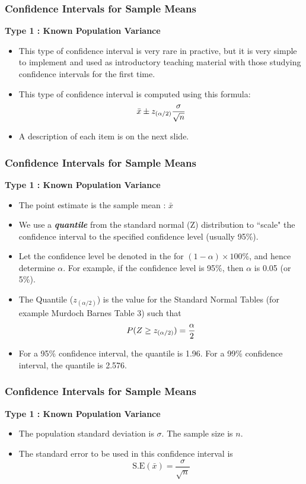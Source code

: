 \documentclass[a4]{beamer}
\begin{document}
\begin{frame}
\frametitle{Confidence Intervals for Sample Means}
\textbf{Type 1 : Known Population Variance}\\
\begin{itemize}
\item This type of confidence interval is very rare in practive, but it is very simple to implement and used as introductory
teaching material with those studying confidence intervals for the first time.
\item This type of confidence interval is computed using this formula:
\[ \bar{x} \pm z_{(\alpha/2)}{\sigma \over \sqrt{n}} \]
\item A description of each item is on the next slide.
\end{itemize}
\end{frame}


\begin{frame}
\frametitle{Confidence Intervals for Sample Means}
\textbf{Type 1 : Known Population Variance}\\
\begin{itemize}

\item The point estimate is the sample mean : $\bar{x}$

\item We use a \textbf{\textit{quantile}} from the standard normal (Z) distribution to ``scale"
the confidence interval to the specified confidence level (usually 95\%).

\item Let the confidence level be denoted in the for $(1-\alpha)\times 100\%$, and hence determine $\alpha$.
For example, if the confidence level is 95\%, then $\alpha$ is 0.05 (or 5\%).

\item The Quantile ($z_{(\alpha/2)}$) is the value for the Standard Normal Tables (for example Murdoch Barnes Table 3) such that
\[ P(Z \geq z_{(\alpha/2)}) = {\alpha \over 2}\]

\item For a 95\% confidence interval, the quantile is 1.96. For a 99\% confidence interval, the quantile is 2.576.
\end{itemize}
\end{frame}
\begin{frame}
\frametitle{Confidence Intervals for Sample Means}
\textbf{Type 1 : Known Population Variance}\\
\begin{itemize}

\item The population standard deviation is $\sigma$. The sample size is $n$.
\item The standard error to be used in this confidence interval is
\[ \mbox{S.E}(\bar{x}) = \frac{\sigma}{\sqrt{n}}\]

\end{itemize}
\end{frame}
\end{document}
